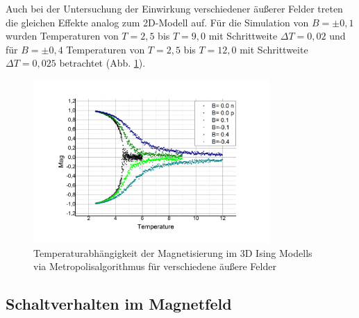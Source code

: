 Auch bei der Untersuchung der Einwirkung verschiedener äußerer Felder treten die gleichen Effekte analog zum 2D-Modell auf. Für die Simulation von $B=\pm 0,1$ wurden Temperaturen von $T=2,5$ bis $T=9,0$ mit Schrittweite $\Delta T= 0,02$ und für $B=\pm 0,4$ Temperaturen von $T=2,5$ bis $T=12,0$ mit Schrittweite $\Delta T= 0,025$ betrachtet (Abb. \ref{mp3db}).
 \begin{figure}[H]
	\centering
	\includegraphics[width=0.8\textwidth]{../Graph_Export/MP3D/m(T)_MP3D_Plot.jpg}	
	\caption{Temperaturabhängigkeit der Magnetisierung im 3D Ising Modells via Metropolisalgorithmus für verschiedene äußere Felder}
	\label{mp3db}
\end{figure}


\subsection{Schaltverhalten im Magnetfeld}
\label{auswB}

